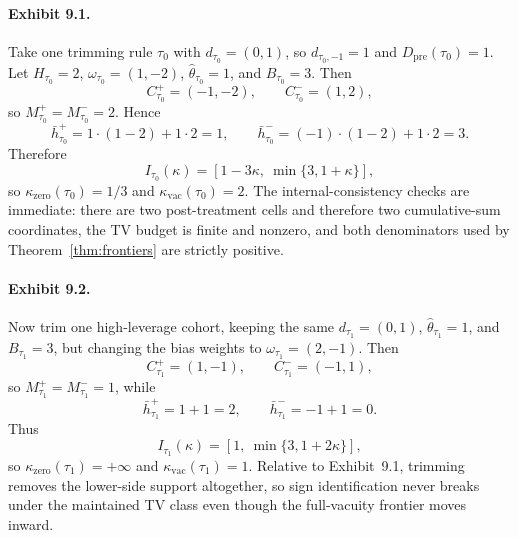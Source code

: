 \documentclass[11pt]{article}
\theoremstyle{definition}
\theoremstyle{plain}
\theoremstyle{remark}
\begin{document}
\paragraph{Exhibit 9.1.}
Take one trimming rule \(\tau_0\) with \(d_{\tau_0}= (0,1)\), so \(d_{\tau_0,-1}=1\) and \(D_{\mathrm{pre}}(\tau_0)=1\). Let \(H_{\tau_0}=2\), \(\omega_{\tau_0}=(1,-2)\), \(\hat\theta_{\tau_0}=1\), and \(B_{\tau_0}=3\). Then
\[
  C_{\tau_0}^{+}=(-1,-2),\qquad C_{\tau_0}^{-}=(1,2),
\]
so \(M_{\tau_0}^{+}=M_{\tau_0}^{-}=2\). Hence
\[
  \bar h_{\tau_0}^{+}
  =
  1\cdot(1-2)+1\cdot 2
  =1,
  \qquad
  \bar h_{\tau_0}^{-}
  =
  (-1)\cdot(1-2)+1\cdot 2
  =3.
\]
Therefore
\[
  I_{\tau_0}(\kappa)
  =
  [1-3\kappa,\ \min\{3,1+\kappa\}],
\]
so \(\kappa_{\mathrm{zero}}(\tau_0)=1/3\) and \(\kappa_{\mathrm{vac}}(\tau_0)=2\). The internal-consistency checks are immediate: there are two post-treatment cells and therefore two cumulative-sum coordinates, the TV budget is finite and nonzero, and both denominators used by Theorem~\ref{thm:frontiers} are strictly positive.

\paragraph{Exhibit 9.2.}
Now trim one high-leverage cohort, keeping the same \(d_{\tau_1}=(0,1)\), \(\hat\theta_{\tau_1}=1\), and \(B_{\tau_1}=3\), but changing the bias weights to \(\omega_{\tau_1}=(2,-1)\). Then
\[
  C_{\tau_1}^{+}=(1,-1),\qquad C_{\tau_1}^{-}=(-1,1),
\]
so \(M_{\tau_1}^{+}=M_{\tau_1}^{-}=1\), while
\[
  \bar h_{\tau_1}^{+}=1+1=2,
  \qquad
  \bar h_{\tau_1}^{-}=-1+1=0.
\]
Thus
\[
  I_{\tau_1}(\kappa)
  =
  [1,\ \min\{3,1+2\kappa\}],
\]
so \(\kappa_{\mathrm{zero}}(\tau_1)=+\infty\) and \(\kappa_{\mathrm{vac}}(\tau_1)=1\). Relative to Exhibit~9.1, trimming removes the lower-side support altogether, so sign identification never breaks under the maintained TV class even though the full-vacuity frontier moves inward.
\end{document}
